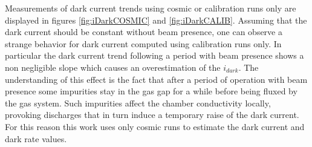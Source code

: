 Measurements of dark current trends using cosmic or calibration runs only are displayed in figures \ref{fig:iDarkCOSMIC} and \ref{fig:iDarkCALIB}.
Assuming that the dark current should be constant without beam presence, one can observe a strange behavior for dark current computed using calibration runs only.
In particular the dark current trend following a period with beam presence shows a non negligible slope which causes an overestimation of the $i_{dark}$.
The understanding of this effect is the fact that after a period of operation with beam presence some impurities stay in the gas gap for a while before being fluxed by the gas system.
Such impurities affect the chamber conductivity locally, provoking discharges that in turn induce a temporary raise of the dark current.
For this reason this work uses only cosmic runs to estimate the dark current and dark rate values.

